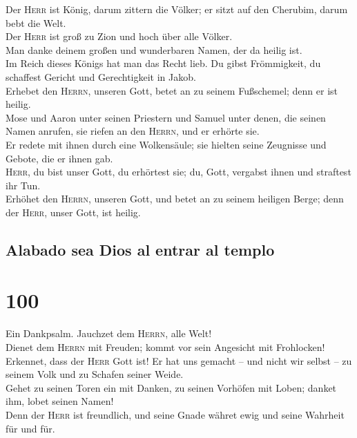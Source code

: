  Der \textsc{Herr} ist König, darum zittern die Völker; er
sitzt auf den Cherubim, darum bebt die Welt.\\
 Der \textsc{Herr} ist groß zu Zion und hoch über alle
Völker.\\
 Man danke deinem großen und wunderbaren Namen, der da
heilig ist.\\
 Im Reich dieses Königs hat man das Recht lieb. Du gibst
Frömmigkeit, du schaffest Gericht und Gerechtigkeit in Jakob.\\
 Erhebet den \textsc{Herrn}, unseren Gott, betet an zu
seinem Fußschemel; denn er ist heilig.\\
 Mose und Aaron unter seinen Priestern und Samuel unter
denen, die seinen Namen anrufen, sie riefen an den \textsc{Herrn}, und
er erhörte sie.\\
 Er redete mit ihnen durch eine Wolkensäule; sie hielten
seine Zeugnisse und Gebote, die er ihnen gab.\\
 \textsc{Herr}, du bist unser Gott, du erhörtest sie; du,
Gott, vergabst ihnen und straftest ihr Tun.\\
 Erhöhet den \textsc{Herrn}, unseren Gott, und betet an zu
seinem heiligen Berge; denn der \textsc{Herr}, unser Gott, ist heilig.

\hypertarget{alabado-sea-dios-al-entrar-al-templo}{%
\subsection{Alabado sea Dios al entrar al
templo}\label{alabado-sea-dios-al-entrar-al-templo}}

\hypertarget{section-99}{%
\section{100}\label{section-99}}

 Ein Dankpsalm. Jauchzet dem \textsc{Herrn}, alle Welt!\\
 Dienet dem \textsc{Herrn} mit Freuden; kommt vor sein
Angesicht mit Frohlocken!\\
 Erkennet, dass der \textsc{Herr} Gott ist! Er hat uns
gemacht -- und nicht wir selbst -- zu seinem Volk und zu Schafen seiner
Weide.\\
 Gehet zu seinen Toren ein mit Danken, zu seinen Vorhöfen
mit Loben; danket ihm, lobet seinen Namen!\\
 Denn der \textsc{Herr} ist freundlich, und seine Gnade
währet ewig und seine Wahrheit für und für.

